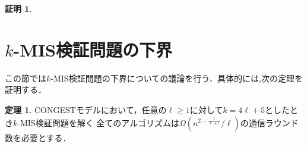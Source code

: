 \documentclass[12pt]{thesis}
\newcommand{\CONGEST}{\textsf{CONGEST}}
\theoremstyle{definition}
\newtheorem{theorem}{定理}[chapter]
\newtheorem*{prf*}{証明}
\begin{document}
\begin{prf*}

\end{prf*}
\newpage

\section{$k$-MIS検証問題の下界}
この節では$k$-MIS検証問題の下界についての議論を行う．具体的には,次の定理を証明する．
\begin{theorem}
{\CONGEST}モデルにおいて，任意の$\ell \geq 1$に対して$k = 4\ell + 5$としたとき$k$-MIS検証問題を解く
全てのアルゴリズムは$\Omega\left(n^{2 - \frac{1}{\ell+1}}/\ell \right)$の通信ラウンド数を必要とする．
\end{theorem}
\end{document}
